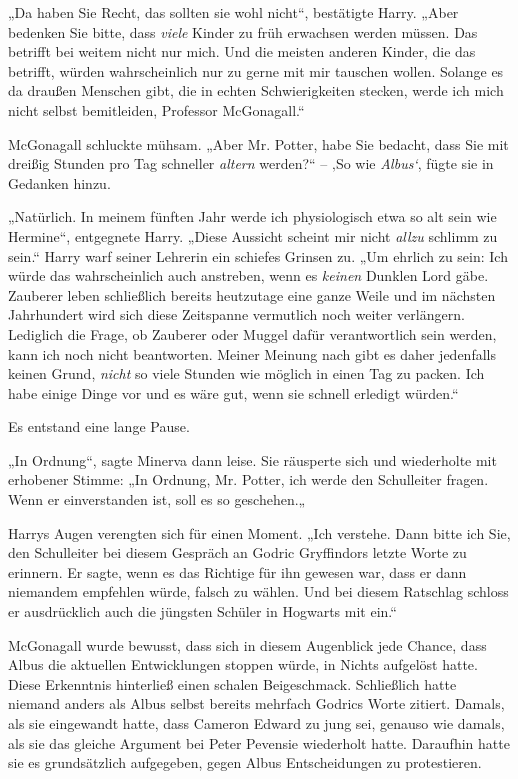 {„Da haben Sie Recht, das sollten sie wohl nicht“, bestätigte Harry. „Aber bedenken Sie bitte, dass \emph{viele} Kinder zu früh erwachsen werden müssen. Das betrifft bei weitem nicht nur mich. Und die meisten anderen Kinder, die das betrifft, würden wahrscheinlich nur zu gerne mit mir tauschen wollen. Solange es da draußen Menschen gibt, die in echten Schwierigkeiten stecken, werde ich mich nicht selbst bemitleiden, Professor McGonagall.“

McGonagall schluckte mühsam. „Aber Mr. Potter, habe Sie bedacht, dass Sie mit dreißig Stunden pro Tag schneller \emph{altern} werden?“ -- ‚So wie \emph{Albus`}, fügte sie in Gedanken hinzu.

„Natürlich. In meinem fünften Jahr werde ich physiologisch etwa so alt sein wie Hermine“, entgegnete Harry. „Diese Aussicht scheint mir nicht \emph{allzu} schlimm zu sein.“ Harry warf seiner Lehrerin ein schiefes Grinsen zu. „Um ehrlich zu sein: Ich würde das wahrscheinlich auch anstreben, wenn es \emph{keinen} Dunklen Lord gäbe. Zauberer leben schließlich bereits heutzutage eine ganze Weile und im nächsten Jahrhundert wird sich diese Zeitspanne vermutlich noch weiter verlängern. Lediglich die Frage, ob Zauberer oder Muggel dafür verantwortlich sein werden, kann ich noch nicht beantworten. Meiner Meinung nach gibt es daher jedenfalls keinen Grund, \emph{nicht} so viele Stunden wie möglich in einen Tag zu packen. Ich habe einige Dinge vor und es wäre gut, wenn sie schnell erledigt würden.“

Es entstand eine lange Pause.

„In Ordnung“, sagte Minerva dann leise. Sie räusperte sich und wiederholte mit erhobener Stimme: „In Ordnung, Mr. Potter, ich werde den Schulleiter fragen. Wenn er einverstanden ist, soll es so geschehen.„

Harrys Augen verengten sich für einen Moment. „Ich verstehe. Dann bitte ich Sie, den Schulleiter bei diesem Gespräch an Godric Gryffindors letzte Worte zu erinnern. Er sagte, wenn es das Richtige für ihn gewesen war, dass er dann niemandem empfehlen würde, falsch zu wählen. Und bei diesem Ratschlag schloss er ausdrücklich auch die jüngsten Schüler in Hogwarts mit ein.“

McGonagall wurde bewusst, dass sich in diesem Augenblick jede Chance, dass Albus die aktuellen Entwicklungen stoppen würde, in Nichts aufgelöst hatte. Diese Erkenntnis hinterließ einen schalen Beigeschmack. Schließlich hatte niemand anders als Albus selbst bereits mehrfach Godrics Worte zitiert. Damals, als sie eingewandt hatte, dass Cameron Edward zu jung sei, genauso wie damals, als sie das gleiche Argument bei Peter Pevensie wiederholt hatte. Daraufhin hatte sie es grundsätzlich aufgegeben, gegen Albus Entscheidungen zu protestieren.

}
